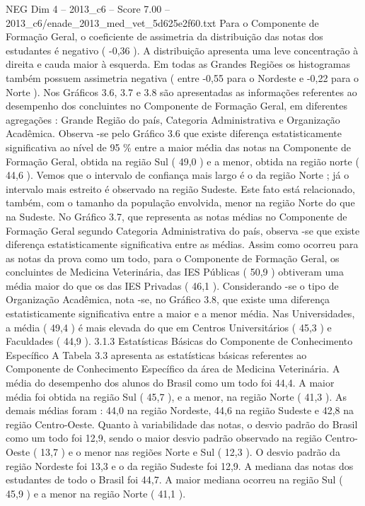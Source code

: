 \begin{textsample}{NEG Dim 4 – 2013\_c6 – Score 7.00 – 2013\_c6/enade\_2013\_med\_vet\_5d625e2f60.txt}
Para o Componente de Formação Geral, o coeficiente de assimetria da distribuição das notas dos estudantes é negativo ( -0,36 ).
A distribuição apresenta uma leve concentração à direita e cauda maior à esquerda.
Em todas as Grandes Regiões os histogramas também possuem assimetria negativa ( entre -0,55 para o Nordeste e -0,22 para o Norte ).
Nos Gráficos 3.6, 3.7 e 3.8 são apresentadas as informações referentes ao desempenho dos concluintes no Componente de Formação Geral, em diferentes agregações : Grande Região do país, Categoria Administrativa e Organização Acadêmica.
Observa -se pelo Gráfico 3.6 que existe diferença estatisticamente significativa ao nível de 95 \% entre a maior média das notas na Componente de Formação Geral, obtida na região Sul ( 49,0 ) e a menor, obtida na região norte ( 44,6 ).
Vemos que o intervalo de confiança mais largo é o da região Norte ; já o intervalo mais estreito é observado na região Sudeste.
Este fato está relacionado, também, com o tamanho da população envolvida, menor na região Norte do que na Sudeste.
No Gráfico 3.7, que representa as notas médias no Componente de Formação Geral segundo Categoria Administrativa do país, observa -se que existe diferença estatisticamente significativa entre as médias.
Assim como ocorreu para as notas da prova como um todo, para o Componente de Formação Geral, os concluintes de Medicina Veterinária, das IES Públicas ( 50,9 ) obtiveram uma média maior do que os das IES Privadas ( 46,1 ).
Considerando -se o tipo de Organização Acadêmica, nota -se, no Gráfico 3.8, que existe uma diferença estatisticamente significativa entre a maior e a menor média.
Nas Universidades, a média ( 49,4 ) é mais elevada do que em Centros Universitários ( 45,3 ) e Faculdades ( 44,9 ). 3.1.3 Estatísticas Básicas do Componente de Conhecimento Específico A Tabela 3.3 apresenta as estatísticas básicas referentes ao Componente de Conhecimento Específico da área de Medicina Veterinária.
A média do desempenho dos alunos do Brasil como um todo foi 44,4.
A maior média foi obtida na região Sul ( 45,7 ), e a menor, na região Norte ( 41,3 ).
As demais médias foram : 44,0 na região Nordeste, 44,6 na região Sudeste e 42,8 na região Centro-Oeste.
Quanto à variabilidade das notas, o desvio padrão do Brasil como um todo foi 12,9, sendo o maior desvio padrão observado na região Centro-Oeste ( 13,7 ) e o menor nas regiões Norte e Sul ( 12,3 ).
O desvio padrão da região Nordeste foi 13,3 e o da região Sudeste foi 12,9.
A mediana das notas dos estudantes de todo o Brasil foi 44,7.
A maior mediana ocorreu na região Sul ( 45,9 ) e a menor na região Norte ( 41,1 ).

\end{textsample}
